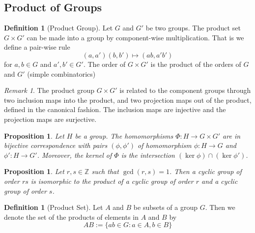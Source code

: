 \documentclass[12pt]{article}
\newtheorem{prop}[thm]{Proposition}
\theoremstyle{definition}
\newtheorem{defn}[thm]{Definition}
\theoremstyle{remark}
\newtheorem{rmk}[thm]{Remark}
\numberwithin{equation}{section}
\newcommand\Z{\mathbb Z}    %
\begin{document}
\vspace{15pt}

\subsection{Product of Groups}


\begin{defn}[Product Group]
        Let $G$ and $G'$ be two groups. The product set $G\times G'$ can be made into a group by component-wise multiplication. That is we define a pair-wise rule \begin{equation}
                (a,a')(b,b')\mapsto (ab,a'b')
        \end{equation}
        for $a,b\in G$ and $a',b' \in G'$. The order of $G\times G'$ is the product of the orders of $G$ and $G'$ (simple combinatorics)
\end{defn}

\vspace{15pt}


\begin{rmk}
        The product group $G\times G'$ is related to the component groups through two inclusion maps into the product, and two projection maps out of the product, defined in the canonical fashion. The inclusion maps are injective and the projection maps are surjective.
\end{rmk}


\vspace{15pt}

\begin{prop}
        Let $H$ be a group. The homomorphisms $\Phi:H \rightarrow G\times G'$ are in bijective correspondence with pairs $(\phi,\phi')$ of homomorphism $\phi:H\rightarrow G$ and $\phi':H\rightarrow G'$. Moreover, the kernel of $\Phi$ is the intersection $(\ker \phi)\cap (\ker \phi')$.
\end{prop}

\vspace{15pt}

\begin{prop}
        Let $r,s\in \Z$ such that $\gcd(r,s) = 1$. Then a cyclic group of order $rs$ is isomorphic to the product of a cyclic group of order $r$ and a cyclic group of order $s$.
\end{prop}

\vspace{15pt}


\begin{defn}[Product Set]
        Let $A$ and $B$ be subsets of a group $G$. Then we denote the set of the products of elements in $A$ and $B$ by \begin{equation}
                AB := \{ab \in G:a\in A, b \in B\}
        \end{equation}
\end{defn}
\end{document}
